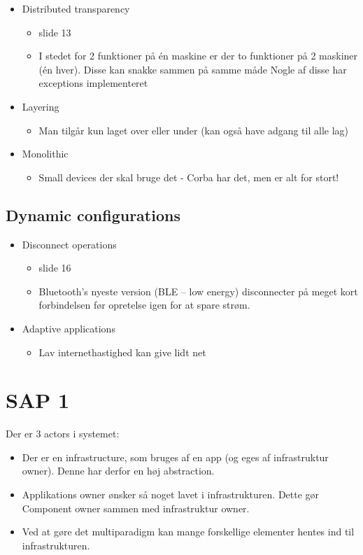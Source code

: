 \documentclass[10pt, a4]{Memoir}
\begin{document}
\begin{itemize}
\item Distributed transparency
	\begin{itemize}
	\item slide 13
	\item I stedet for 2 funktioner på én maskine er der to funktioner på 2 maskiner (én hver). Disse kan snakke sammen på samme måde
	\subitem Nogle af disse har exceptions implementeret
	\end{itemize}

\item Layering
	\begin{itemize}
	\item Man tilgår kun laget over eller under (kan også have adgang til alle lag)
	\end{itemize}

\item Monolithic 
	\begin{itemize}
	\item Small devices der skal bruge det - Corba har det, men er alt for stort!
	\end{itemize}

\end{itemize}

\subsection{Dynamic configurations}

\begin{itemize}
\item Disconnect operations
	\begin{itemize}
	\item slide 16
	\item Bluetooth's nyeste version (BLE -- low energy) disconnecter på meget kort forbindelsen før opretelse igen for at spare strøm.
	\end{itemize}

\item Adaptive applications
	\begin{itemize}
	\item Lav internethastighed kan give lidt net
	\end{itemize}

\end{itemize}






\section{SAP 1}
Der er 3 actors i systemet:
\begin{itemize}
\item Der er en infrastructure, som bruges af en app (og eges af infrastruktur owner). Denne har derfor en høj abstraction.
\item Applikations owner ønsker så noget lavet i infrastrukturen. 
Dette gør Component owner sammen med infrastruktur owner.
\item Ved at gøre det multiparadigm kan mange forskellige elementer hentes ind til infrastrukturen.
\end{itemize}
\end{document}
